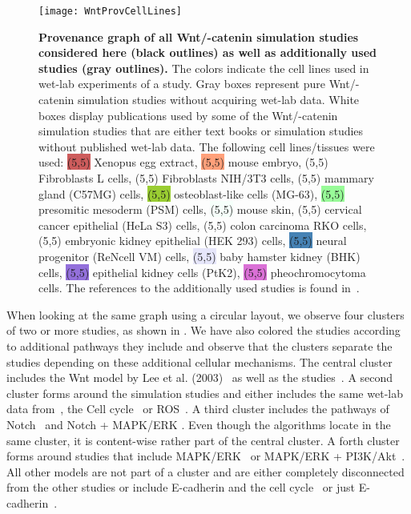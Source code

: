 \documentclass[10pt,letterpaper]{article}
\newcommand{\bcat}{\textbeta-catenin}
\newcommand{\wnt}{Wnt}
\newcommand{\lee}{Lee et al. (2003)}
\begin{document}
\begin{figure}[!h]
\begin{adjustwidth}{-2.25in}{0in}
\centering
\texttt{[image: WntProvCellLines]}
\caption{{\bf Provenance graph of all \wnt{}/\bcat{} simulation studies considered here (black outlines) as well as additionally used studies (gray outlines).}
The colors indicate the cell lines used in wet-lab experiments of a study.
Gray boxes represent pure \wnt{}/\bcat{} simulation studies without acquiring wet-lab data.
White boxes display publications used by some of the \wnt{}/\bcat{} simulation studies that are either text books or simulation studies without published wet-lab data.
The following cell lines/tissues were used:
\colorbox{IndianRed}{\makebox(5,5){}} Xenopus egg extract, 
\colorbox{LightSalmon}{\makebox(5,5){}} mouse embryo,
\colorbox{color1}{\makebox(5,5){}} Fibroblasts L cells,
\colorbox{color2}{\makebox(5,5){}} Fibroblasts NIH/3T3 cells,
\colorbox{color3}{\makebox(5,5){}} mammary gland (C57MG) cells,
\colorbox{YellowGreen}{\makebox(5,5){}} osteoblast-like cells (MG-63),
\colorbox{PaleGreen}{\makebox(5,5){}} presomitic mesoderm (PSM) cells,
\colorbox{MintCream}{\makebox(5,5){}} mouse skin,
\colorbox{color4}{\makebox(5,5){}} cervical cancer epithelial (HeLa S3) cells,
\colorbox{color5}{\makebox(5,5){}} colon carcinoma RKO cells,
\colorbox{color6}{\makebox(5,5){}} embryonic kidney epithelial (HEK 293) cells,
\colorbox{SteelBlue}{\makebox(5,5){}} neural progenitor (ReNcell VM) cells,
\colorbox{Lavender}{\makebox(5,5){}} baby hamster kidney (BHK) cells,
\colorbox{MediumPurple}{\makebox(5,5){}} epithelial kidney cells (PtK2),
\colorbox{Orchid}{\makebox(5,5){}} pheochromocytoma cells.
The references to the additionally used studies is found in~.
}
\label{fig:WntProvNeato}
\end{adjustwidth}
\end{figure}

When looking at the same graph using a circular layout, we observe four clusters of two or more studies, as shown in .
We have also colored the studies according to additional pathways they include and observe that the clusters separate the studies depending on these additional cellular mechanisms.
The central cluster includes the \wnt{} model by \lee{}~\cite{Lee2003} as well as the studies~\cite{Cho2006, vanLeeuwen2007, Wawra2007, Mirams2010}.
A second cluster forms around the simulation studies \cite{Mazemondet2012, Kogan2012, Haack2015, Haack2020, Staehlke2020} and either includes the same wet-lab data from~\cite{Bafico2001, Hannoush2008}, the Cell cycle~\cite{Mazemondet2012} or ROS~\cite{Haack2015, Staehlke2020}.
A third cluster includes the pathways of Notch~\cite{Rodriguez2007, Wang2013} and Notch + MAPK/ERK \cite{Goldbeter2008}. Even though the algorithms locate \cite{Kruger2004} in the same cluster, it is content-wise rather part of the central cluster.
A forth cluster forms around studies that include MAPK/ERK~\cite{Kim2007} or MAPK/ERK + PI3K/Akt~\cite{Padala2017}.
All other models are not part of a cluster and are either completely disconnected from the other studies \cite{Sick2006} or include E-cadherin and the cell cycle~\cite{vanLeeuwen2009} or just E-cadherin~\cite{Chen2014}.
\end{document}
